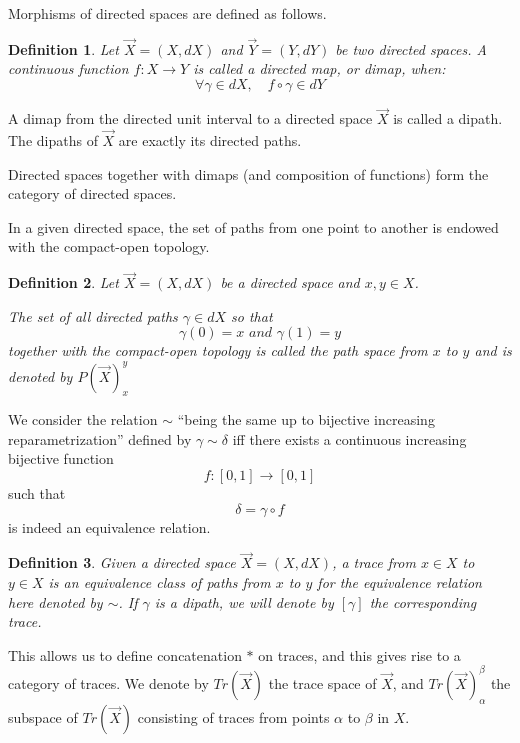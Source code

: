 \documentclass{article}
\newtheorem{definition}{Definition}[section]
\begin{document}
Morphisms of directed spaces are defined as follows.
\begin{definition}
Let $\Vec{X} = (X, dX)$ and $\Vec{Y} = (Y, dY)$ be two directed spaces. A continuous function $f : X \to Y$ is called a {directed map}, or {dimap}, when:
\[\forall \gamma \in dX, \quad 
f \circ \gamma \in dY\]

\end{definition}

A dimap from the directed unit interval to a directed space $\Vec{X}$ is called a {dipath}. The dipaths of $\Vec{X}$ are exactly its directed paths.

Directed spaces together with dimaps (and composition of functions) form the category of directed spaces. %

In a given directed space, the set of paths from one point to another is endowed with the compact-open topology.

\begin{definition}
Let $\Vec{X} = (X, dX)$ be a directed space and $x,y \in X$. 

The set of all directed paths $\gamma \in dX$ so that 
\[\gamma(0) = x \textit{ and } \gamma (1) = y\]
together with the compact-open topology is called the {path space} from $x$ to $y$ and is denoted by ${P(\Vec{X})_x^y}$ 
\end{definition}



We consider the relation $\sim$ ``being the same up to bijective increasing repara\-metrization'' defined by
$\gamma \sim \delta$  iff there exists a continuous increasing bijective function 
\[f : [0,1] \to [0,1]\]
\noindent such that
\[\delta = \gamma \circ f \]
is indeed an equivalence relation.

\begin{definition}
Given a directed space $\Vec{X} = (X, dX)$, a {trace} from $x \in X$ to $y \in X$ is an equivalence class of paths from $x$ to $y$ for the equivalence relation here denoted by $\sim$.
If $\gamma$ is a dipath, we will denote by ${[\gamma]}$ the corresponding trace.
\end{definition}



This allows us to define concatenation $*$ on traces, and this gives rise to a category of traces. We denote by $Tr(\Vec{X})$ the trace space of $\Vec{X}$, and $Tr(\Vec{X})_\alpha^\beta$ the subspace of $Tr(\Vec{X})$ consisting of traces from points $\alpha$ to $\beta$ in $X$. 
\end{document}
